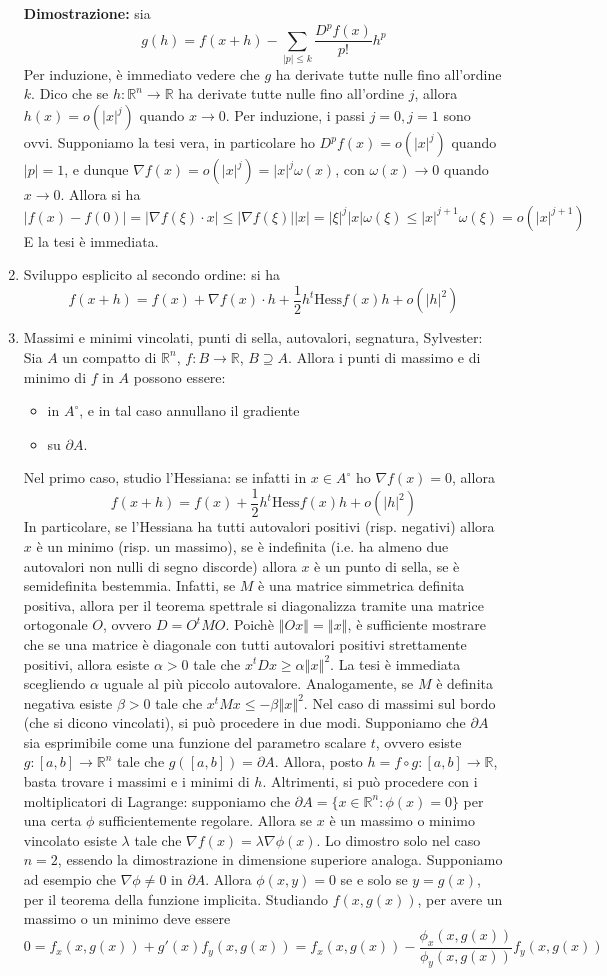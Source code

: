 \documentclass[a4paper,11pt]{article}
\newcommand{\norm}[1]{\left\Vert#1\right\Vert}
\begin{document}
\begin{enumerate}
	\textbf{Dimostrazione:} sia
	\[g(h)=f(x+h)-\sum_{|p|\leq k}\frac{D^pf(x)}{p!}h^p\]
	Per induzione, è immediato vedere che $g$ ha derivate tutte nulle fino all'ordine $k$. Dico che se $h\colon\mathbb{R}^n\to\mathbb{R}$ ha derivate tutte nulle fino all'ordine $j$, allora $h(x)=o(|x|^j)$ quando $x\to0$. Per induzione, i passi $j=0,j=1$ sono ovvi. Supponiamo la tesi vera, in particolare ho $D^p f(x)=o(|x|^{j})$ quando $|p|=1$, e dunque $\nabla f(x)=o(|x|^j)=|x|^j\omega(x)$, con $\omega(x)\to0$ quando $x\to0$. Allora si ha
	\[|f(x)-f(0)|=|\nabla f(\xi)\cdot x|\leq|\nabla f(\xi)||x|=|\xi|^j|x|\omega(\xi)\leq|x|^{j+1}\omega(\xi)=o(|x|^{j+1})\]
	E la tesi è immediata.
	\item Sviluppo esplicito al secondo ordine: si ha
	\[f(x+h)=f(x)+\nabla f(x)\cdot h+\frac{1}{2}h^t\textrm{Hess}f(x)h+o(|h|^2)\]
	\item Massimi e minimi vincolati, punti di sella, autovalori, segnatura, Sylvester:
	Sia $A$ un compatto di $\mathbb{R}^n$, $f\colon B\to\mathbb{R}$, $B\supseteq A$. Allora i punti di massimo e di minimo di $f$ in $A$ possono essere:
	\begin{itemize}
		\item in $A^\circ$, e in tal caso annullano il gradiente
		\item su $\partial A$.
	\end{itemize}
	Nel primo caso, studio l'Hessiana: se infatti in $x\in A^\circ$ ho $\nabla f(x)=0$, allora
	\[f(x+h)=f(x)+\frac{1}{2}h^t\textrm{Hess}f(x)h+o(|h|^2)\]
	In particolare, se l'Hessiana ha tutti autovalori positivi (risp. negativi) allora $x$ è un minimo (risp. un massimo), se è indefinita (i.e. ha almeno due autovalori non nulli di segno discorde) allora $x$ è un punto di sella, se è semidefinita bestemmia.
	Infatti, se $M$ è una matrice simmetrica definita positiva, allora per il teorema spettrale si diagonalizza tramite una matrice ortogonale $O$, ovvero $D=O^tMO$. Poichè $\norm{Ox}=\norm{x}$, è sufficiente mostrare che se una matrice è diagonale con tutti autovalori positivi strettamente positivi, allora esiste $\alpha>0$ tale che $x^tDx\geq\alpha \norm{x}^2$. La tesi è immediata scegliendo $\alpha$ uguale al più piccolo autovalore. Analogamente, se $M$ è definita negativa esiste $\beta>0$ tale che $x^tMx\leq -\beta\norm{x}^2$.
	Nel caso di massimi sul bordo (che si dicono vincolati), si può procedere in due modi. Supponiamo che $\partial A$ sia esprimibile come una funzione del parametro scalare $t$, ovvero esiste $g\colon[a,b]\to\mathbb{R}^n$ tale che $g([a,b])=\partial A$. Allora, posto $h=f\circ g\colon[a,b]\to\mathbb{R}$, basta trovare i massimi e i minimi di $h$. Altrimenti, si può procedere con i moltiplicatori di Lagrange: supponiamo che $\partial A=\{x\in\mathbb{R}^n:\phi(x)=0\}$ per una certa $\phi$ sufficientemente regolare. Allora se $x$ è un massimo o minimo vincolato esiste $\lambda$ tale che $\nabla f(x)=\lambda \nabla\phi(x)$. Lo dimostro solo nel caso $n=2$, essendo la dimostrazione in dimensione superiore analoga. Supponiamo ad esempio che $\nabla\phi\neq0$ in $\partial A$. Allora $\phi(x,y)=0$ se e solo se $y=g(x)$, per il teorema della funzione implicita. Studiando $f(x,g(x))$, per avere un massimo o un minimo deve essere \[0=f_x(x,g(x))+g'(x)f_y(x,g(x))=f_x(x,g(x))-\frac{\phi_x(x,g(x))}{\phi_y(x,g(x))}f_y(x,g(x))\]

\end{enumerate}
\end{document}
